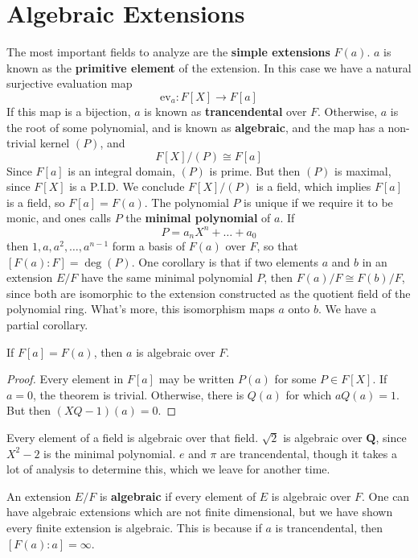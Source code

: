 \section{Algebraic Extensions}

The most important fields to analyze are the {\bf simple extensions} $F(a)$. $a$ is known as the {\bf primitive element} of the extension. In this case we have a natural surjective evaluation map
%
\[ \text{ev}_a: F[X] \to F[a] \]
%
If this map is a bijection, $a$ is known as {\bf trancendental} over $F$. Otherwise, $a$ is the root of some polynomial, and is known as {\bf algebraic}, and the map has a non-trivial kernel $(P)$, and
%
\[ F[X]/(P) \cong F[a] \]
%
Since $F[a]$ is an integral domain, $(P)$ is prime. But then $(P)$ is maximal, since $F[X]$ is a P.I.D. We conclude $F[X]/(P)$ is a field, which implies $F[a]$ is a field, so $F[a] = F(a)$. The polynomial $P$ is unique if we require it to be monic, and ones calls $P$ the {\bf minimal polynomial} of $a$. If
%
\[ P = a_n X^n + \dots + a_0 \]
%
then $1, a, a^2, \dots, a^{n-1}$ form a basis of $F(a)$ over $F$, so that $[F(a):F] = \deg(P)$. One corollary is that if two elements $a$ and $b$ in an extension $E/F$ have the same minimal polynomial $P$, then $F(a)/F \cong F(b)/F$, since both are isomorphic to the extension constructed as the quotient field of the polynomial ring. What's more, this isomorphism maps $a$ onto $b$. We have a partial corollary.

\begin{lemma}
    If $F[a] = F(a)$, then $a$ is algebraic over $F$.
\end{lemma}
\begin{proof}
    Every element in $F[a]$ may be written $P(a)$ for some $P \in F[X]$. If $a = 0$, the theorem is trivial. Otherwise, there is $Q(a)$ for which $aQ(a) = 1$. But then $(XQ - 1)(a) = 0$.
\end{proof}

\begin{example}
    Every element of a field is algebraic over that field. $\sqrt{2}$ is algebraic over $\mathbf{Q}$, since $X^2 - 2$ is the minimal polynomial. $e$ and $\pi$ are trancendental, though it takes a lot of analysis to determine this, which we leave for another time.
\end{example}

An extension $E/F$ is {\bf algebraic} if every element of $E$ is algebraic over $F$. One can have algebraic extensions which are not finite dimensional, but we have shown every finite extension is algebraic. This is because if $a$ is trancendental, then $[F(a): a] = \infty$.

